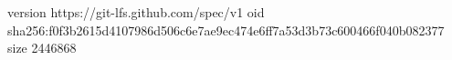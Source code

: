 version https://git-lfs.github.com/spec/v1
oid sha256:f0f3b2615d4107986d506c6e7ae9ec474e6ff7a53d3b73c600466f040b082377
size 2446868
